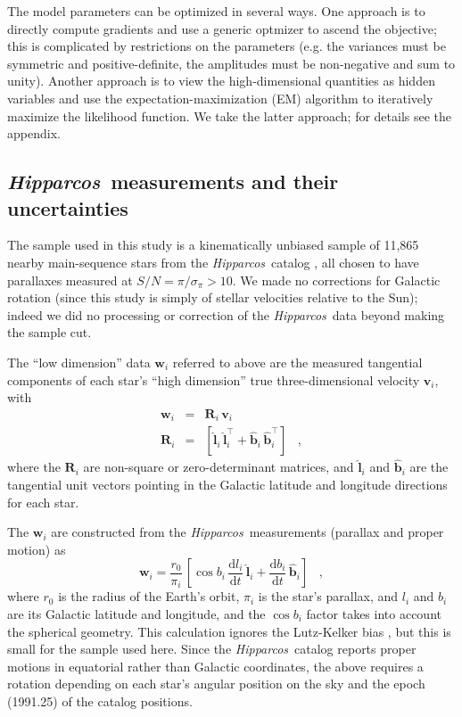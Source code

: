 \documentclass[12pt,preprint]{aastex}
\newcommand{\Hipparcos}{\textit{Hipparcos}}
\renewcommand{\vec}[1]{\mathbf{#1}} %
\newcommand{\vv}{\vec{v}}
\newcommand{\ww}{\vec{w}}
\newcommand{\eel}{\vec{\hat{l}}_i}
\newcommand{\eeb}{\vec{\hat{b}}_i}
\newcommand{\vvi}{\vv_i}
\newcommand{\wwi}{\ww_i}
\newcommand{\ten}[1]{\mathbf{#1}} %
\newcommand{\RR}{\ten{R}}
\newcommand{\RRi}{\RR_i}
\newcommand{\T}{^{\scriptscriptstyle \top}}   %
\begin{document}
The model parameters can be optimized in several ways.  One approach
is to directly compute gradients and use a generic optmizer to ascend
the objective; this is complicated by restrictions on the parameters
(e.g. the variances must be symmetric and positive-definite, the
amplitudes must be non-negative and sum to unity). Another approach is
to view the high-dimensional quantities as hidden variables and use
the expectation-maximization (EM) algorithm \citep{dempster77a} to
iteratively maximize the likelihood function. We take the latter
approach; for details see the appendix.

\subsection{\Hipparcos\ measurements and their uncertainties}

The sample used in this study is a kinematically unbiased sample of
11,865 nearby main-sequence stars \citep{dehnen98a} from the
\Hipparcos\ catalog \citep{esa97a}, all chosen to have parallaxes
measured at $S/N= \pi/\sigma_{\pi} >10$.  We made no corrections for
Galactic rotation (since this study is simply of stellar velocities
relative to the Sun); indeed we did no processing or correction of the
\Hipparcos\ data beyond making the sample cut.

The ``low dimension'' data $\wwi$ referred to above are the measured
tangential components of each star's ``high dimension'' true
three-dimensional velocity $\vvi$, with
\begin{eqnarray}\displaystyle
\wwi &=& \RRi\,\vvi \nonumber \\
\RRi &=& [\eel\,\eel\T+\eeb\,\eeb\T] \;\;\;,
\end{eqnarray}
where the $\RRi$ are non-square or zero-determinant matrices, and
$\eel$ and $\eeb$ are the tangential unit vectors pointing in the
Galactic latitude and longitude directions for each star.

The $\wwi$ are constructed from the \Hipparcos\ measurements (parallax
and proper motion) as
\begin{equation}
\wwi = \frac{r_0}{\pi_i}\,
       \left[\cos b_i\,\frac{\mathrm{d}l_i}{\mathrm{d}t}\,\eel +
       \frac{\mathrm{d}b_i}{\mathrm{d}t}\,\eeb\right] \;\;\;,
\end{equation}
where $r_0$ is the radius of the Earth's orbit, $\pi_i$ is the star's
parallax, and $l_i$ and $b_i$ are its Galactic latitude and longitude,
and the $\cos b_i$ factor takes into account the spherical geometry.
This calculation ignores the Lutz-Kelker bias \citep{lutz73a}, but
this is small for the sample used here.  Since the \Hipparcos\ catalog
reports proper motions in equatorial rather than Galactic coordinates,
the above requires a rotation depending on each star's angular
position on the sky and the epoch (1991.25) of the catalog positions.
\end{document}
